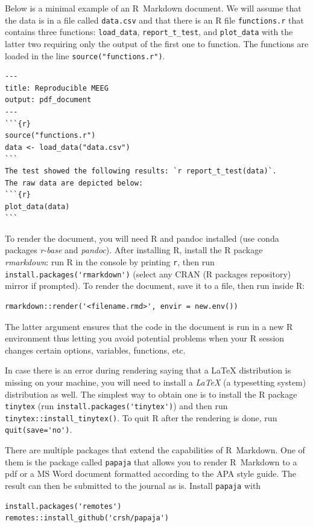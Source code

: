 \documentclass[a4paper,man,floatsintext,natbib]{apa6}
\begin{document}
Below is a minimal example of an R~Markdown document. We will assume that the data is in a file called \verb|data.csv| and that there is an R file \verb|functions.r| that contains three functions: \verb|load_data|, \verb|report_t_test|, and \verb|plot_data| with the latter two requiring only the output of the first one to function. The functions are loaded in the line \verb|source("functions.r")|.

\begin{verbatim}
---
title: Reproducible MEEG
output: pdf_document
---
```{r}
source("functions.r")
data <- load_data("data.csv")
```
The test showed the following results: `r report_t_test(data)`.
The raw data are depicted below:
```{r}
plot_data(data)
```
\end{verbatim}

To render the document, you will need R and pandoc installed (use conda packages \emph{r-base} and \emph{pandoc}). After installing R, install the R package \emph{rmarkdown}: run R in the console by printing \verb|r|, then run \verb|install.packages('rmarkdown')| (select any CRAN (R packages repository) mirror if prompted). To render the document, save it to a file, then run inside R:

\begin{verbatim}
rmarkdown::render('<filename.rmd>', envir = new.env())
\end{verbatim}

The latter argument ensures that the code in the document is run in a new R environment thus letting you avoid potential problems when your R session changes certain options, variables, functions, etc. 

In case there is an error during rendering saying that a LaTeX distribution is missing on your machine, you will need to install a \emph{LaTeX} (a typesetting system) distribution as well. The simplest way to obtain one is to install the R package \verb|tinytex| (run \verb|install.packages('tinytex')|) and then run \verb|tinytex::install_tinytex()|. To quit R after the rendering is done, run \verb|quit(save='no')|.

There are multiple packages that extend the capabilities of R~Markdown. One of them is the package called \verb|papaja| that allows you to render R~Markdown to a pdf or a MS Word document formatted according to the APA style guide. The result can then be submitted to the journal as is. Install \verb|papaja| with

\begin{verbatim}
install.packages('remotes')
remotes::install_github('crsh/papaja')
\end{verbatim}
\end{document}
